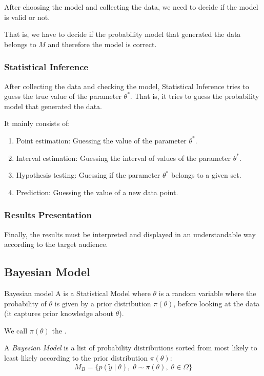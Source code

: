 After choosing the model and collecting the data, we need to decide if
the model is valid or not.

That is, we have to decide if the probability model that generated the data
belongs to $M$ and therefore the model is correct.

\subsubsection{Statistical Inference}

After collecting the data and checking the model, Statistical Inference
tries to guess the true value of the parameter $\theta^*$. That is, it tries
to guess the probability model that generated the data.

It mainly consists of:
\begin{enumerate}
	\item Point estimation: Guessing the value of the parameter $\theta^*$.
	\item Interval estimation: Guessing the interval of values of the parameter $\theta^*$.
	\item Hypothesis testing: Guessing if the parameter $\theta^*$ belongs to a given set.
	\item Prediction: Guessing the value of a new data point.
\end{enumerate}

\subsubsection{Results Presentation}

Finally, the results must be interpreted and displayed in an understandable way
according to the target audience.

\subsection{Bayesian Model}

\begin{definition}{Bayesian model}{}{}
	A  is a Statistical Model where $\theta$ is a random variable
	where the probability of $\theta$ is given by a prior distribution $\pi(\theta)$,
	before looking at the data (it captures prior knowledge about $\theta$).

	We call $\pi(\theta)$ the .

	A \emph{Bayesian Model} is a list of probability distributions sorted from most
	likely to least likely according to the prior distribution $\pi(\theta)$:
	\begin{equation}
		M_B = \{ p(\tilde{y}\mid\theta), \; \theta \sim \pi(\theta), \; \theta \in \Omega \}
	\end{equation}
\end{definition}

